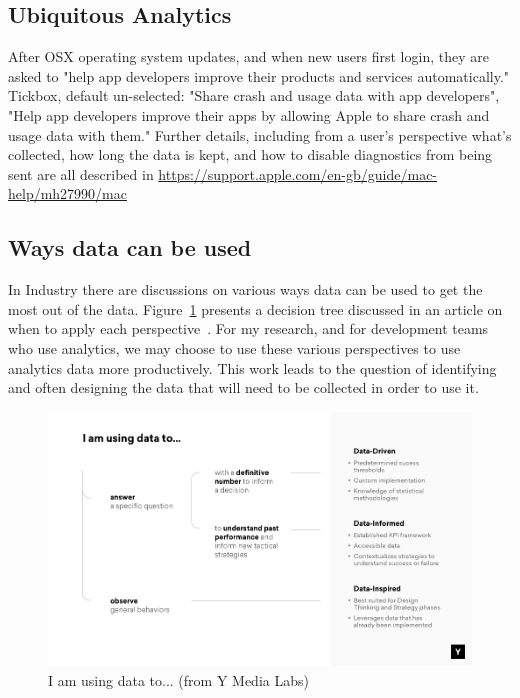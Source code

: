 \subsection{Ubiquitous Analytics}
After OSX operating system updates, and when new users first login, they are asked to "help app developers improve their products and services automatically." Tickbox, default un-selected: "Share crash and usage data with app developers", "Help app developers improve their apps by allowing Apple to share crash and usage data with them." Further details, including from a user's perspective what's collected, how long the data is kept, and how to disable diagnostics from being sent are all described in \url{https://support.apple.com/en-gb/guide/mac-help/mh27990/mac}

\subsection{Ways data can be used}
In Industry there are discussions on various ways data can be used to get the most out of the data. Figure~\ref{fig:i_am_using_data_to} presents a decision tree discussed in an article on when to apply each perspective~\cite{amplitude_are_you_data_driven}. For my research, and for development teams who use analytics, we may choose to use these various perspectives to use analytics data more productively. This work leads to the question of identifying and often designing the data that will need to be collected in order to use it.

\begin{figure}[!htbp]
    \centering
    \includegraphics[width=15cm]{images/data-informed-graphic-ymedia-labs.png}
    \caption{I am using data to... (from Y Media Labs)~\cite{amplitude_are_you_data_driven}}
    \label{fig:i_am_using_data_to}
\end{figure}

